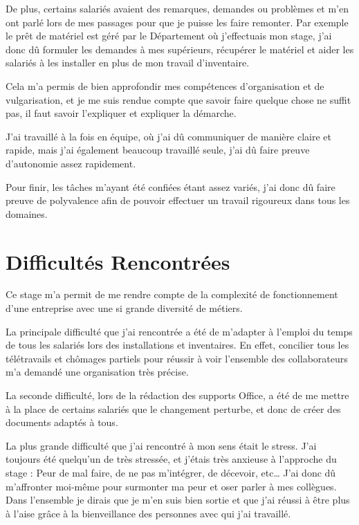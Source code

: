 De plus, certains salariés avaient des remarques, demandes ou problèmes et m'en ont parlé lors de mes passages pour que je puisse les faire remonter.
Par exemple le prêt de matériel est géré par le Département où j'effectuais mon stage, j'ai donc dû formuler les demandes à mes supérieurs, récupérer le matériel et aider les salariés à les installer en plus de mon travail d'inventaire.

Cela m'a permis de bien approfondir mes compétences d'organisation et de vulgarisation, et je me suis rendue compte que savoir faire quelque chose ne suffit pas, il faut savoir l'expliquer et expliquer la démarche.

J'ai travaillé à la fois en équipe, où j'ai dû communiquer de manière claire et rapide, mais j'ai également beaucoup travaillé seule, j'ai dû faire preuve d'autonomie assez rapidement.

Pour finir, les tâches m’ayant été confiées étant assez variés, j’ai donc dû faire preuve de polyvalence afin de pouvoir effectuer un travail rigoureux dans tous les domaines.

\section{Difficultés Rencontrées}

Ce stage m'a permit de me rendre compte de la complexité de fonctionnement d'une entreprise avec une si grande diversité de métiers.

La principale difficulté que j'ai rencontrée a été de m'adapter à l'emploi du temps de tous les salariés lors des installations et inventaires.
En effet, concilier tous les télétravails et chômages partiels pour réussir à voir l'ensemble des collaborateurs m'a demandé une organisation très précise.

La seconde difficulté, lors de la rédaction des supports Office, a été de me mettre à la place de certains salariés que le changement perturbe, et donc de créer des documents adaptés à tous.

La plus grande difficulté que j’ai rencontré à mon sens était le stress. J’ai toujours été quelqu’un de très stressée, et j’étais très anxieuse à l’approche du stage : Peur de mal faire, de ne pas m’intégrer, de décevoir, etc\dots
J’ai donc dû m’affronter moi-même pour surmonter ma peur et oser parler à mes collègues. Dans l’ensemble je dirais que je m’en suis bien sortie et que j’ai réussi à être plus à l’aise grâce à la bienveillance des personnes avec qui j’ai travaillé.

